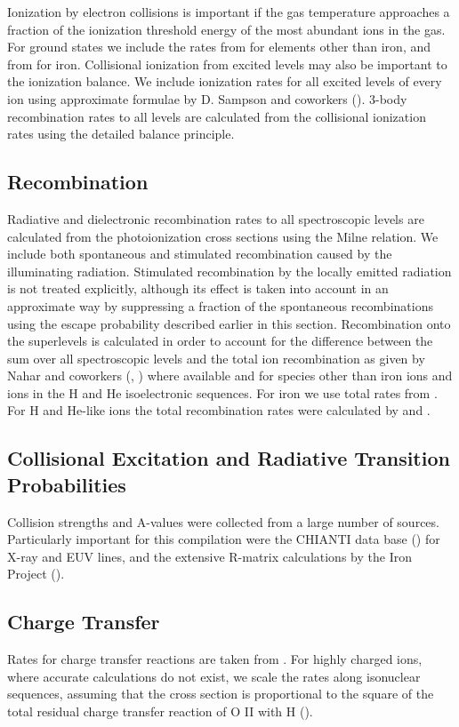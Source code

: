 Ionization by electron collisions is important
if the gas temperature approaches a fraction of the ionization threshold energy of
the most abundant ions in the gas.   For ground states we include 
the rates from \cite{Raymond1976} for elements other than 
iron, and from \cite{Arnaud1992} for iron. 
Collisional ionization from excited levels may also be
important to the ionization balance. We include ionization rates 
for all excited levels of every ion using approximate formulae by 
D. Sampson and coworkers (\cite{sampsonzhang}).   
3-body recombination rates to all levels are calculated from  the
collisional ionization rates using the detailed balance principle. 

\subsection{Recombination}

Radiative and dielectronic
recombination rates to all spectroscopic levels are calculated from the
photoionization cross sections using the Milne
relation.   We include both spontaneous and stimulated recombination 
caused by the illuminating radiation.  Stimulated recombination by the 
locally emitted radiation is not treated explicitly, although its effect 
is taken into account in an approximate way by suppressing a fraction of the 
spontaneous recombinations using the escape probability described 
earlier in this section.
Recombination onto the superlevels is calculated in order to account
for the difference between the sum over all spectroscopic levels and 
the total ion recombination as given by Nahar and coworkers (\cite{Nahar1999},
\cite{Nahar2000}) where available and \cite{Aldrovandi1973} for species 
other than iron ions and ions in the H and He isoelectronic sequences.
For iron we use total rates from 
\cite{Arnaud1992}. For H and He-like ions the total recombination rates
were calculated by \cite{bautista1998} and \cite{bautista2000}. 

\subsection{Collisional Excitation and Radiative Transition Probabilities}

Collision strengths and A-values were collected from a large number
of sources.  Particularly important for this compilation were the 
CHIANTI data base (\cite{chianti}) for X-ray and EUV lines,  
and the extensive R-matrix calculations by the Iron Project (\cite{ironp}).

\subsection{Charge Transfer}

Rates for charge transfer reactions are taken from \cite{Butler1980}.
For highly charged ions, where accurate calculations
do not exist, we scale the rates  along isonuclear sequences,
assuming that the cross section is proportional to the square of the 
total residual charge transfer reaction of O II with H 
(\cite{Field1971}).


